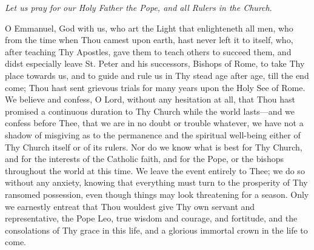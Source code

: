 \emph{Let us pray for our Holy
Father the Pope, and all Rulers in the Church}.

O Emmanuel, God with us, who art
the Light that enlighteneth all men, who from the time when Thou camest
upon earth, hast never left it to itself, who, after teaching Thy
Apostles, gave them to teach others to succeed them, and didst
especially leave St. Peter and his successors, Bishops of Rome, to take
Thy place towards us, and to guide and rule us in Thy stead age after
age, till the end come; Thou hast sent grievous trials for many years
upon the Holy See of Rome. We believe and confess, O Lord, without any
hesitation at all, that Thou hast promised a continuous duration to Thy
Church while the world lasts—and we confess before Thee, that we are
in no doubt or trouble whatever, we have not a shadow of misgiving as to
the permanence and the spiritual well-being either of Thy Church itself
or of its rulers. Nor do we know what is best for Thy Church, and for
the interests of the Catholic faith, and for the Pope, or the bishops
throughout the world at this time. We leave the event entirely to Thee;
we do so without any anxiety, knowing that everything must turn to the
prosperity of Thy ransomed possession, even though things may look threatening for a season. Only we earnestly entreat that Thou wouldest
give Thy own servant and representative, the Pope Leo, true wisdom and
courage, and fortitude, and the consolations of Thy grace in this life,
and a glorious immortal crown in the life to come.


